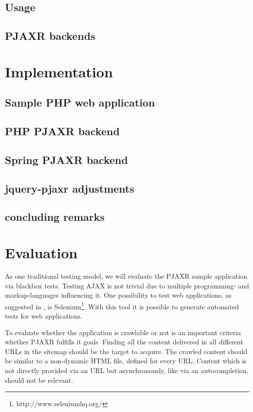 \documentclass[f,bachelor,binding,twoside,palatino]{WeSTthesis}
\def \ajax {AJAX}
\def \pjaxr {PJAXR}
\def \jqueryPjaxr {jquery-pjaxr}
\begin{document}
\subsection{Usage}

\subsection{\pjaxr{} backends}

\section{Implementation}

\subsection{Sample PHP web application}

\subsection{PHP \pjaxr{} backend}

\subsection{Spring \pjaxr{} backend}

\subsection{\jqueryPjaxr{} adjustments}

\subsection{concluding remarks}

\section{Evaluation}
As one traditional testing model, we will evaluate the \pjaxr{} sample application via blackbox tests.
Testing \ajax{} is not trivial due to multiple programming- and markup-languages influencing it. 
One possibility to test web applications, as suggested in \cite{lundmark11}, is Selenium\footnote{http://www.seleniumhq.org/}.
With this tool it is possible to generate automated tests for web applications.

To evaluate whether the application is crawlable or not is an important criteria whether \pjaxr{} fulfills it goals.
Finding all the content delivered in all different URLs in the sitemap should be the target to acquire.
The crawled content should be similar to a non-dynamic HTML file, defined for every URL.
Content which is not directly provided via an URL but asynchronously, like via an autocompletion, should not be relevant.
\end{document}
